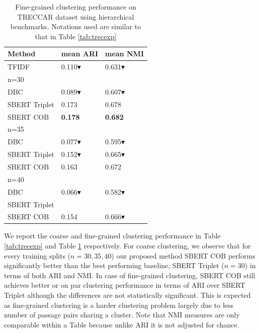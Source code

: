 \documentclass[11pt,a4paper]{article}
\begin{document}
\begin{table}[h]
\caption{Fine-grained clustering performance on TRECCAR dataset using hierarchical benchmarks. Notations used are similar to that in Table \ref{tab:trecexp}}
\label{tab:trecexp2}
\begin{tabular}{lll}
\hline
Method        & mean ARI & mean NMI \\ \hline
TFIDF         & 0.110$\blacktriangledown$ & 0.631$\blacktriangledown$ \\ \hline
n=30&&\\
DBC           & 0.089$\blacktriangledown$ & 0.607$\blacktriangledown$ \\
SBERT Triplet & 0.173 & 0.678 \\
SBERT COB     & \textbf{0.178} & \textbf{0.682} \\ \hline
n=35&&\\
DBC           & 0.077$\blacktriangledown$ & 0.595$\blacktriangledown$ \\
SBERT Triplet & 0.152$\blacktriangledown$ & 0.665$\blacktriangledown$ \\
SBERT COB     & 0.163 & 0.672 \\ \hline
n=40&&\\
DBC           & 0.066$\blacktriangledown$ & 0.582$\blacktriangledown$ \\
SBERT Triplet & & \\
SBERT COB     & 0.154 & 0.666$\blacktriangledown$
\end{tabular}
\end{table}

We report the coarse and fine-grained clustering performance in Table \ref{tab:trecexp} and Table \ref{tab:trecexp2} respectively. For coarse clustering, we observe that for every training splits ($n=30,35,40$) our proposed method SBERT COB performs significantly better than the best performing baseline, SBERT Triplet ($n=30$) in terms of both ARI and NMI. In case of fine-grained clustering, SBERT COB still achieves better or on par clustering performance in terms of ARI over SBERT Triplet although the differences are not statistically significant. This is expected as fine-grained clustering is a harder clustering problem largely due to less number of passage pairs sharing a cluster. Note that NMI measures are only comparable within a Table because unlike ARI it is not adjusted for chance.
\end{document}

